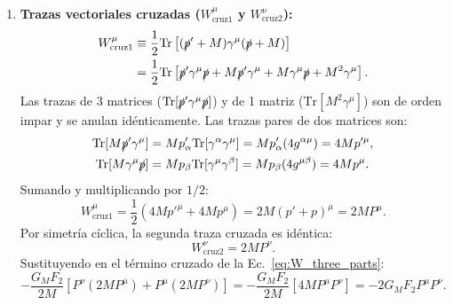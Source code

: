 \documentclass[10pt,a4paper]{article}
\begin{document}
\begin{enumerate}
    \item \textbf{Trazas vectoriales cruzadas ($W_{\text{cruz1}}^\mu$ y $W_{\text{cruz2}}^\nu$):}
    \begin{align}
    W_{\text{cruz1}}^\mu &\equiv \frac{1}{2} \text{Tr} \left[ (\slashed{p}' + M) \gamma^\mu (\slashed{p} + M) \right] \nonumber \\
    &= \frac{1}{2} \text{Tr} \left[ \slashed{p}' \gamma^\mu \slashed{p} + M \slashed{p}' \gamma^\mu + M \gamma^\mu \slashed{p} + M^2 \gamma^\mu \right].
    \end{align}
    Las trazas de 3 matrices ($\text{Tr}[\slashed{p}'\gamma^\mu\slashed{p}]$) y de 1 matriz ($\text{Tr}[M^2\gamma^\mu]$) son de orden impar y se anulan idénticamente. Las trazas pares de dos matrices son:
    \begin{align}
    \text{Tr}[M \slashed{p}' \gamma^\mu] &= M p'_\alpha \text{Tr}[\gamma^\alpha \gamma^\mu] = M p'_\alpha (4 g^{\alpha\mu}) = 4 M p'^\mu, \\
    \text{Tr}[M \gamma^\mu \slashed{p}] &= M p_\beta \text{Tr}[\gamma^\mu \gamma^\beta] = M p_\beta (4 g^{\mu\beta}) = 4 M p^\mu.
    \end{align}
    Sumando y multiplicando por $1/2$:
    \begin{equation}
    W_{\text{cruz1}}^\mu = \frac{1}{2} (4 M p'^\mu + 4 M p^\mu) = 2 M (p' + p)^\mu = 2 M P^\mu.
    \end{equation}
    Por simetría cíclica, la segunda traza cruzada es idéntica:
    \begin{equation}
    W_{\text{cruz2}}^\nu = 2 M P^\nu.
    \end{equation}
    Sustituyendo en el término cruzado de la Ec.~\eqref{eq:W_three_parts}:
    \begin{equation}
    -\frac{G_M F_2}{2M} \left[ P^\nu (2 M P^\mu) + P^\mu (2 M P^\nu) \right] = -\frac{G_M F_2}{2M} \left[ 4 M P^\mu P^\nu \right] = -2 G_M F_2 P^\mu P^\nu.
    \label{eq:W_cruz_eval}
    \end{equation}


\end{enumerate}
\end{document}
